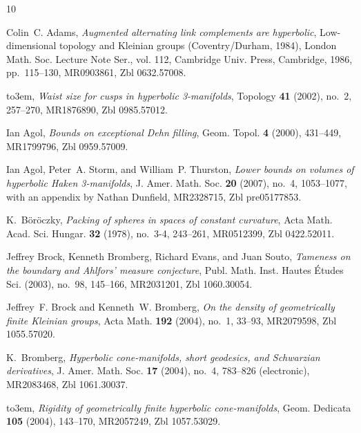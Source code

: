 \documentclass[11pt]{amsart}
\theoremstyle{plain}
\theoremstyle{definition}
\begin{document}
%

\providecommand{\bysame}{\leavevmode\hbox to3em{\hrulefill}\thinspace}
\providecommand{\href}[2]{#2}
\begin{thebibliography}{10}

Colin~C. Adams, \emph{Augmented alternating link complements are hyperbolic},
  Low-dimensional topology and Kleinian groups (Coventry/Durham, 1984), London
  Math. Soc. Lecture Note Ser., vol. 112, Cambridge Univ. Press, Cambridge,
  1986, pp.~115--130, MR0903861, Zbl 0632.57008.

\bysame, \emph{Waist size for cusps in hyperbolic 3-manifolds}, Topology
  \textbf{41} (2002), no.~2, 257--270, MR1876890, Zbl 0985.57012.

Ian Agol, \emph{Bounds on exceptional {D}ehn filling}, Geom. Topol. \textbf{4}
  (2000), 431--449, MR1799796, Zbl 0959.57009.

Ian Agol, Peter~A. Storm, and William~P. Thurston, \emph{{Lower bounds on
  volumes of hyperbolic Haken 3-manifolds}}, J. Amer. Math. Soc. \textbf{20}
  (2007), no.~4, 1053--1077, with an appendix by Nathan
Dunfield, MR2328715, Zbl pre05177853.

K.~B{\"o}r{\"o}czky, \emph{Packing of spheres in spaces of constant curvature},
  Acta Math. Acad. Sci. Hungar. \textbf{32} (1978), no.~3-4, 243--261,
	MR0512399, Zbl 0422.52011.

Jeffrey Brock, Kenneth Bromberg, Richard Evans, and Juan Souto, \emph{Tameness
  on the boundary and {A}hlfors' measure conjecture}, Publ. Math. Inst. Hautes
  \'Etudes Sci. (2003), no.~98, 145--166, MR2031201, Zbl 1060.30054.

Jeffrey~F. Brock and Kenneth~W. Bromberg, \emph{On the density of geometrically
  finite {K}leinian groups}, Acta Math. \textbf{192} (2004), no.~1,
33--93, MR2079598, Zbl 1055.57020.

K.~Bromberg, \emph{Hyperbolic cone-manifolds, short geodesics, and {S}chwarzian
  derivatives}, J. Amer. Math. Soc. \textbf{17} (2004), no.~4, 783--826
  (electronic), MR2083468, Zbl 1061.30037.

\bysame, \emph{Rigidity of geometrically finite hyperbolic cone-manifolds},
  Geom. Dedicata \textbf{105} (2004), 143--170, MR2057249, Zbl 1057.53029.


\end{thebibliography}
\end{document}

